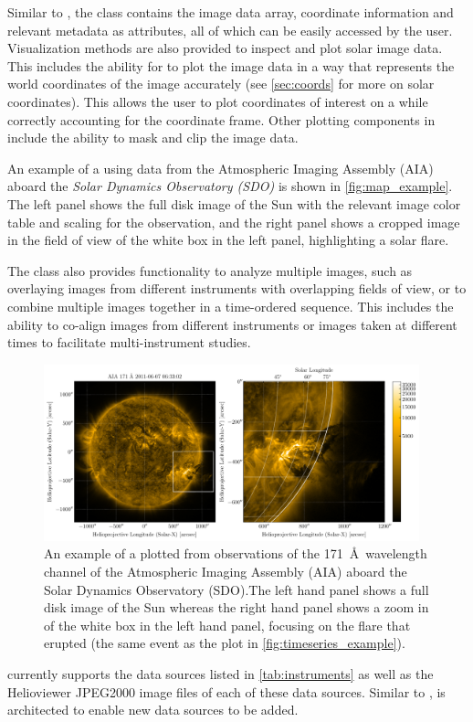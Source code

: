 Similar to \Timeseries, the \Map class contains the image data array, coordinate information and relevant metadata as attributes, all of which can be easily accessed by the user.
Visualization methods are also provided to inspect and plot solar image data.
This includes the ability for \Map to plot the image data in a way that represents the world coordinates of the image accurately (see \autoref{sec:coords} for more on solar coordinates).
This allows the user to plot coordinates of interest on a \Map while correctly accounting for the coordinate frame.
Other plotting components in \Map include the ability to mask and clip the image data.

An example of a \Map using data from the Atmospheric Imaging Assembly (AIA) aboard the \textit{Solar Dynamics Observatory (SDO)} is shown in \autoref{fig:map_example}.
The left panel shows the full disk image of the Sun with the relevant image color table and scaling for the observation, and the right panel shows a cropped image in the field of view of the white box in the left panel, highlighting a solar flare.

The \Map class also provides functionality to analyze multiple images, such as overlaying images from different instruments with overlapping fields of view, or to combine multiple images together in a time-ordered sequence.
This includes the ability to co-align images from different instruments or images taken at different times to facilitate multi-instrument studies.


\begin{figure}
    \centering
    \includegraphics[width=0.97\textwidth]{figures/map_example.pdf}
    \caption{An example of a \sunpypkg \Map plotted from observations of the 171~\AA\ wavelength channel of the Atmospheric Imaging Assembly (AIA) aboard the Solar Dynamics Observatory (SDO).The left hand panel shows a full disk image of the Sun whereas the right hand panel shows a zoom in of the white box in the left hand panel, focusing on the flare that erupted (the same event as the \Timeseries plot in \autoref{fig:timeseries_example}).}
    \label{fig:map_example}
\end{figure}

\Map currently supports the data sources listed in \autoref{tab:instruments} as well as the Helioviewer JPEG2000 image files of  each of these data sources. Similar to \Timeseries, \Map is architected to enable new data sources to be added. 
